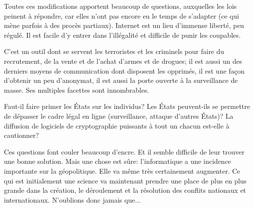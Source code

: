 \documentclass[article, french]{yReport}
\begin{document}
	Toutes ces modifications apportent beaucoup de questions, auxquelles les lois peinent à répondre, car elles n'ont pas encore eu le temps de s'adapter (ce qui mène parfois à des procès partiaux).
	Internet est un lieu d'immense liberté, peu régulé.
	Il est facile d'y entrer dans l'illégalité et difficile de punir les coupables.
	
	C'est un outil dont se servent les terroristes et les criminels pour faire du recrutement, de la vente et de l'achat d'armes et de drogues; il est aussi un des derniers moyens de communication dont disposent les opprimés, il est une façon d'obtenir un peu d'anonymat, il est aussi la porte ouverte à la surveillance de masse.
	Ses multiples facettes sont innombrables.
	
	Faut-il faire primer les États sur les individus? Les États peuvent-ils se permettre de dépasser le cadre légal en ligne (surveillance, attaque d'autres États)? La diffusion de logiciels de cryptographie puissants à tout un chacun est-elle à cautionner?
	
	Ces questions font couler beaucoup d'encre.
	Et il semble difficile de leur trouver une bonne solution.
	Mais une chose est sûre: l'informatique a une incidence importante sur la géopolitique.
	Elle va même très certainement augmenter.
	Ce qui est initialement une science va maintenant prendre une place de plus en plus grande dans la création, le déroulement et la résolution des conflits nationaux et internationaux.
	N'oublions donc jamais que...
	
	
	
	
\end{document}
